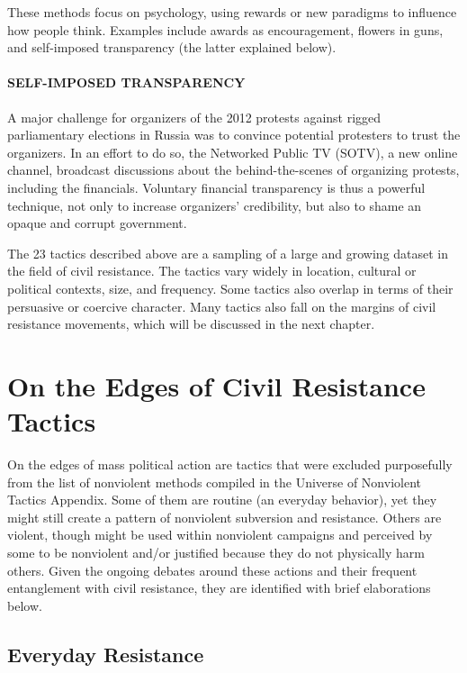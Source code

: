 \documentclass[twoside,a4paper,12pt,fleqn,openany]{extbook}
\begin{document}
These methods focus on psychology, using rewards or new paradigms to influence how people think. Examples include awards as encouragement, flowers in guns, and self-imposed transparency (the latter explained below).

\subsubsection*{SELF-IMPOSED TRANSPARENCY}

A major challenge for organizers of the 2012 protests against rigged parliamentary elections in Russia was to convince potential protesters to trust the organizers. In an effort to do so, the Networked Public TV (SOTV), a new online channel, broadcast discussions about the behind-the-scenes of organizing protests, including the financials. Voluntary financial transparency is thus a powerful technique, not only to increase organizers’ credibility, but also to shame an opaque and corrupt government.

The 23 tactics described above are a sampling of a large and growing dataset in the field of civil resistance. The tactics vary widely in location, cultural or political contexts, size, and frequency. Some tactics also overlap in terms of their persuasive or coercive character. Many tactics also fall on the margins of civil resistance movements, which will be discussed in the next chapter.

\chapter{On the Edges of Civil Resistance Tactics}

On the edges of mass political action are tactics that were excluded purposefully from the list of nonviolent methods compiled in the Universe of Nonviolent Tactics Appendix. Some of them are routine (an everyday behavior), yet they might still create a pattern of nonviolent subversion and resistance. Others are violent, though might be used within nonviolent campaigns and perceived by some to be nonviolent and/or justified because they do not physically harm others. Given the ongoing debates around these actions and their frequent entanglement with civil resistance, they are identified with brief elaborations below.

\section*{Everyday Resistance}
\end{document}
